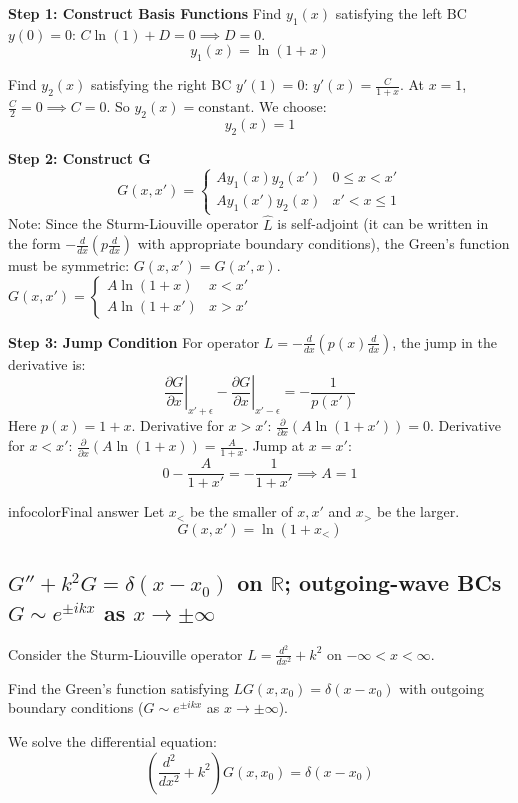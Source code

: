 \documentclass[a4paper,11pt]{article} %
\newenvironment{summarybox}[1][]{\begin{custombox}[#1]{infocolor}{Final answer}}{\end{custombox}}
\begin{document}
\textbf{Step 1: Construct Basis Functions}
Find $y_1(x)$ satisfying the left BC $y(0)=0$:
$C \ln(1) + D = 0 \implies D = 0$.
$$ y_1(x) = \ln(1+x) $$

Find $y_2(x)$ satisfying the right BC $y'(1)=0$:
$y'(x) = \frac{C}{1+x}$. At $x=1$, $\frac{C}{2} = 0 \implies C=0$.
So $y_2(x) = \text{constant}$. We choose:
$$ y_2(x) = 1 $$

\textbf{Step 2: Construct G}
$$ G(x, x') = \begin{cases} A y_1(x)y_2(x') & 0 \le x < x' \\ A y_1(x')y_2(x) & x' < x \le 1 \end{cases} $$
Note: Since the Sturm-Liouville operator $\hat{L}$ is self-adjoint (it can be written in the form $-\frac{d}{dx}(p\frac{d}{dx})$ with appropriate boundary conditions), the Green's function must be symmetric: $G(x,x') = G(x',x)$.
$G(x, x') = \begin{cases} A \ln(1+x) & x < x' \\ A \ln(1+x') & x > x' \end{cases}$

\textbf{Step 3: Jump Condition}
For operator $L = -\frac{d}{dx}(p(x) \frac{d}{dx})$, the jump in the derivative is:
$$ \left. \frac{\partial G}{\partial x} \right|_{x'+\epsilon} - \left. \frac{\partial G}{\partial x} \right|_{x'-\epsilon} = -\frac{1}{p(x')} $$
Here $p(x) = 1+x$.
Derivative for $x > x'$: $\frac{\partial}{\partial x}(A \ln(1+x')) = 0$.
Derivative for $x < x'$: $\frac{\partial}{\partial x}(A \ln(1+x)) = \frac{A}{1+x}$.
Jump at $x=x'$:
$$ 0 - \frac{A}{1+x'} = -\frac{1}{1+x'} \implies A = 1 $$

\begin{summarybox}
Let $x_<$ be the smaller of $x, x'$ and $x_>$ be the larger.
$$ G(x, x') = \ln(1 + x_<) $$
\end{summarybox}

\newpage

\subsection{\texorpdfstring{$G'' + k^2 G = \delta(x-x_0)$ on $\mathbb{R}$; outgoing-wave BCs $G\sim e^{\pm ikx}$ as $x\to\pm\infty$}{Green's function for 1D Helmholtz on real line; continuity and jump condition give $G=\frac{e^{ik|x-x_0|}}{2ik}$}}

\begin{problembox}
Consider the Sturm-Liouville operator $L = \frac{d^2}{dx^2} + k^2$ on $-\infty < x < \infty$.

 Find the Green's function satisfying $LG(x, x_0) = \delta(x - x_0)$ with outgoing boundary conditions ($G \sim e^{\pm ikx}$ as $x \to \pm\infty$).

\end{problembox}
We solve the differential equation:
$$ \left( \frac{d^2}{dx^2} + k^2 \right) G(x, x_0) = \delta(x - x_0) $$
\end{document}
